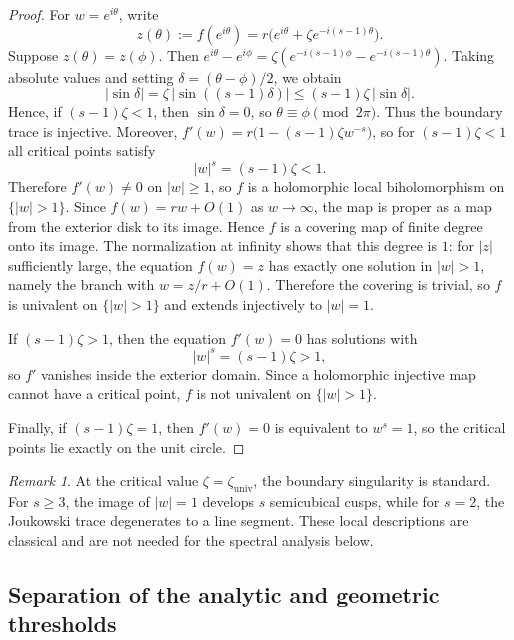 \documentclass[11pt]{amsart}
\numberwithin{equation}{section}
\theoremstyle{plain}
\theoremstyle{definition}
\theoremstyle{remark}
\newtheorem{remark}[theorem]{Remark}
\begin{document}
\begin{proof}
	For \(w=e^{i\theta}\), write
	\[
		z(\theta):=f(e^{i\theta})
		=
		r\bigl(e^{i\theta}+\zeta e^{-i(s-1)\theta}\bigr).
	\]
	Suppose \(z(\theta)=z(\phi)\). Then $
		e^{i\theta}-e^{i\phi}
		=
		\zeta(e^{-i(s-1)\phi}-e^{-i(s-1)\theta})$.
	Taking absolute values and setting \(\delta=(\theta-\phi)/2\), we obtain
	\[
		|\sin\delta|
		=
		\zeta\,|\sin((s-1)\delta)|
		\le
		(s-1)\zeta\,|\sin\delta|.
	\]
	Hence, if \((s-1)\zeta<1\), then \(\sin\delta=0\), so
	\(\theta\equiv\phi\pmod{2\pi}\). Thus the boundary trace is injective.
	Moreover, $
		f'(w)=r\bigl(1-(s-1)\zeta w^{-s}\bigr)$,
	so for \((s-1)\zeta<1\) all critical points satisfy
	\[
		|w|^s=(s-1)\zeta<1.
	\]
	Therefore \(f'(w)\neq0\) on \(|w|\ge1\), so \(f\) is a holomorphic local
	biholomorphism on \(\{|w|>1\}\). Since \(f(w)=rw+O(1)\) as \(w\to\infty\),
	the map is proper as a map from the exterior disk to its image. Hence \(f\)
	is a covering map of finite degree onto its image. The normalization at
	infinity shows that this degree is \(1\): for \(|z|\) sufficiently large,
	the equation \(f(w)=z\) has exactly one solution in \(|w|>1\), namely the
	branch with \(w=z/r+O(1)\). Therefore the covering is trivial, so \(f\) is
	univalent on \(\{|w|>1\}\) and extends injectively to \(|w|=1\).


	If \((s-1)\zeta>1\), then the equation \(f'(w)=0\) has solutions with
	\[
		|w|^s=(s-1)\zeta>1,
	\]
	so \(f'\) vanishes inside the exterior domain. Since a holomorphic
	injective map cannot have a critical point, \(f\) is not univalent on
	\(\{|w|>1\}\).

	Finally, if \((s-1)\zeta=1\), then \(f'(w)=0\) is equivalent to \(w^s=1\),
	so the critical points lie exactly on the unit circle.
\end{proof}

\begin{remark}
	At the critical value \(\zeta=\zeta_{\mathrm{univ}}\), the boundary
	singularity is standard. For \(s\ge3\), the image of \(|w|=1\) develops
	\(s\) semicubical cusps, while for \(s=2\), the Joukowski trace degenerates to a
	line segment. These local descriptions are classical and are not needed for
	the spectral analysis below.
\end{remark}

\subsection{Separation of the analytic and geometric thresholds}
\label{subsec:separation}
\end{document}
